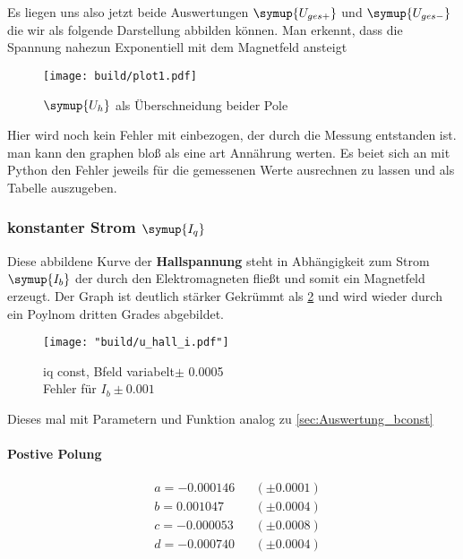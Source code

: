 Es liegen uns also jetzt beide Auswertungen $\symup{U_{ges+}}$ und $\symup{U_{ges-}}$ die wir als folgende Darstellung abbilden können.
Man erkennt, dass die Spannung nahezun Exponentiell mit dem Magnetfeld ansteigt %

\begin{figure}[h]
   \centering
   \texttt{[image: build/plot1.pdf]} %
   \caption{$\symup{U_h}$ als Überschneidung beider Pole}
   \label{fig:auswertunghall}
\end{figure}

Hier wird noch kein Fehler mit einbezogen, der durch die Messung entstanden ist. man kann den graphen bloß als eine art Annährung werten. 
Es beiet sich an mit Python den Fehler jeweils für die gemessenen Werte ausrechnen zu lassen und als Tabelle auszugeben.






\subsubsection{konstanter Strom $\symup{I_q}$}
\label{sec:Auswertung_iconst}

Diese abbildene Kurve der \textbf{Hallspannung} steht in Abhängigkeit zum Strom $\symup{I_b}$ der durch den Elektromagneten fließt und somit ein Magnetfeld erzeugt.
Der Graph ist deutlich stärker Gekrümmt als \ref{fig:Uhall} und wird wieder durch ein Poylnom dritten Grades abgebildet. 


\begin{figure}
   \centering
    \texttt{[image: "build/u\_hall\_i.pdf"]}
    \caption{iq const, Bfeld variabelt$\pm$ 0.0005\\Fehler für $I_b \pm 0.001$}
    \label{fig:Uhall}
 \end{figure}



Dieses mal mit Parametern und Funktion analog zu \ref{sec:Auswertung_bconst}
\paragraph{Postive Polung}

\begin{align*}
&a = -0.000146 &&(\pm  0.0001) \\
&b = 0.001047 &&(\pm  0.0004 ) \\
&c = -0.000053 &&(\pm  0.0008) \\
&d = -0.000740 &&(\pm  0.0004) 
\end{align*}

